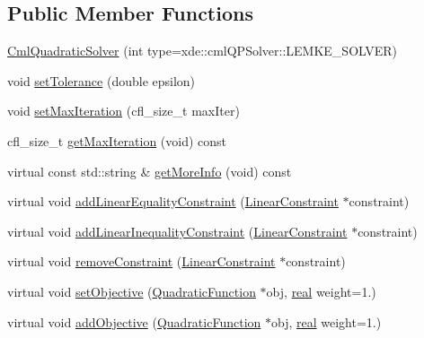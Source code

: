 \subsection*{Public Member Functions}
\begin{DoxyCompactItemize}
\item 
\hyperlink{classocra_1_1CmlQuadraticSolver_a4ef339a5d511aff62bf4f6669fa894b8}{Cml\+Quadratic\+Solver} (int type=xde\+::cml\+Q\+P\+Solver\+::\+L\+E\+M\+K\+E\+\_\+\+S\+O\+L\+V\+ER)
\item 
void \hyperlink{classocra_1_1CmlQuadraticSolver_a6c508788b75053d2bbcc7a3fee4ba26e}{set\+Tolerance} (double epsilon)
\item 
void \hyperlink{classocra_1_1CmlQuadraticSolver_a47a17923b7fdf4d8137fb41e240831d6}{set\+Max\+Iteration} (cfl\+\_\+size\+\_\+t max\+Iter)
\item 
cfl\+\_\+size\+\_\+t \hyperlink{classocra_1_1CmlQuadraticSolver_a89d29bf8618e4d658f6234dd967165ad}{get\+Max\+Iteration} (void) const
\item 
virtual const std\+::string \& \hyperlink{classocra_1_1CmlQuadraticSolver_a95f1b52f24a43f9afc38b36fb7943e05}{get\+More\+Info} (void) const
\item 
virtual void \hyperlink{classocra_1_1CmlQuadraticSolver_afea0aeb47c39f7fb8b3ce068f3d09885}{add\+Linear\+Equality\+Constraint} (\hyperlink{namespaceocra_ae8b87cf4099be3efc3b410019ad2046e}{Linear\+Constraint} $\ast$constraint)
\item 
virtual void \hyperlink{classocra_1_1CmlQuadraticSolver_a5bbf7066fb72a418a174aece3ac65bf5}{add\+Linear\+Inequality\+Constraint} (\hyperlink{namespaceocra_ae8b87cf4099be3efc3b410019ad2046e}{Linear\+Constraint} $\ast$constraint)
\item 
virtual void \hyperlink{classocra_1_1CmlQuadraticSolver_a570e7be65f21d67e41a0f030d5134e4e}{remove\+Constraint} (\hyperlink{namespaceocra_ae8b87cf4099be3efc3b410019ad2046e}{Linear\+Constraint} $\ast$constraint)
\item 
virtual void \hyperlink{classocra_1_1CmlQuadraticSolver_ad286753e3e35fa17f4aef9f8a75bd5b1}{set\+Objective} (\hyperlink{classocra_1_1QuadraticFunction}{Quadratic\+Function} $\ast$obj, \hyperlink{namespaceocra_af4478308ca113669e67d72f9a3050469}{real} weight=1.)
\item 
virtual void \hyperlink{classocra_1_1CmlQuadraticSolver_a531381b1498b0ad4e460e5a2a75da9b4}{add\+Objective} (\hyperlink{classocra_1_1QuadraticFunction}{Quadratic\+Function} $\ast$obj, \hyperlink{namespaceocra_af4478308ca113669e67d72f9a3050469}{real} weight=1.)

\end{DoxyCompactItemize}
